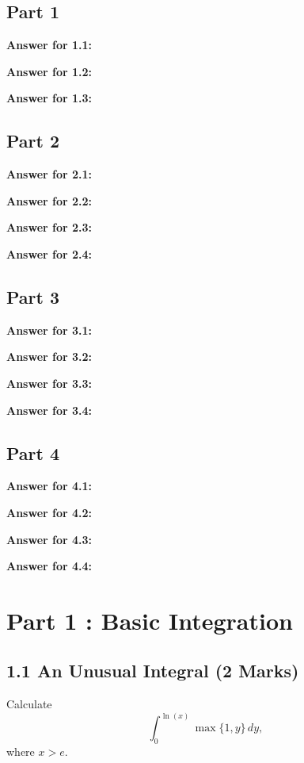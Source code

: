 \documentclass[12pt]{article}
\newcommand{\nullspacebig}{~\\[19pt]}
\begin{document}
\subsection*{Part 1}
\par \textbf{Answer for 1.1: }
\nullspacebig
\par \textbf{Answer for 1.2: }
\nullspacebig
\par \textbf{Answer for 1.3: }
\nullspacebig

\subsection*{Part 2}
\par \textbf{Answer for 2.1: }
\nullspacebig
\par \textbf{Answer for 2.2: }
\nullspacebig
\par \textbf{Answer for 2.3: }
\nullspacebig
\par \textbf{Answer for 2.4: }
\nullspacebig

\subsection*{Part 3} 
\par \textbf{Answer for 3.1: }
\nullspacebig
\par \textbf{Answer for 3.2: }
\nullspacebig
\par \textbf{Answer for 3.3: }
\nullspacebig
\par \textbf{Answer for 3.4: }
\nullspacebig

\subsection*{Part 4}
\par \textbf{Answer for 4.1: }
\nullspacebig
\par \textbf{Answer for 4.2: }
\nullspacebig
\par \textbf{Answer for 4.3: }
\nullspacebig
\par \textbf{Answer for 4.4: }
\nullspacebig

\newpage
\section*{Part 1 : Basic Integration}
\subsection*{1.1 An Unusual Integral (2 Marks)}
\noindent Calculate
\begin{equation*}
    \int^{\ln(x)}_0 \max \{1, y\}\,dy, 
\end{equation*}
where $x > e$.
\end{document}
